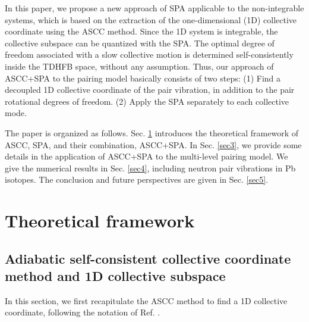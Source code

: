 \documentclass[%
superscriptaddress,
showpacs,
nofootinbib,
amsmath,amssymb,
aps,
prc,
twocolumn,
floatfix ]%
{revtex4-1}
\begin{document}
In this paper,
we propose a new approach of SPA applicable to the non-integrable systems,
which is based on the extraction of the one-dimensional (1D)
collective coordinate
using the ASCC method.
Since the 1D system is integrable,
the collective subspace can be quantized with the SPA.
The optimal degree of freedom associated with a slow collective motion
is determined self-consistently
inside the TDHFB space, without any assumption. 
Thus, our approach of ASCC+SPA to the pairing model
basically consists of two steps:
(1) Find a decoupled 1D collective coordinate of the pair vibration,
in addition to the pair rotational degrees of freedom.
(2) Apply the SPA separately to each collective mode.

The paper is organized as follows. 
Sec. \ref{sec2} introduces the theoretical framework of ASCC, SPA,
and their combination, ASCC+SPA. 
In Sec. \ref{sec3}, we provide some details in the application
of ASCC+SPA to the multi-level pairing model.
We give the numerical results in Sec. \ref{sec4}, including
neutron pair vibrations in Pb isotopes.
The conclusion and future perspectives are given in Sec. \ref{sec5}.


\section{Theoretical framework}
\label{sec2}

\subsection{Adiabatic self-consistent collective coordinate method and
1D collective subspace}
\label{sec:ASCC}
In this section,
we first recapitulate the ASCC method to find a 1D collective coordinate,
following the notation of Ref. \cite{N2012}.
\end{document}
